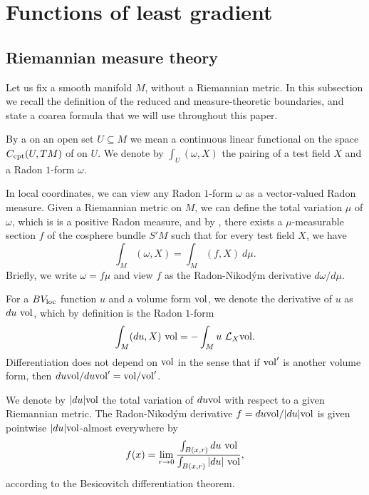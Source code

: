 \section{Functions of least gradient}\label{LeastGradientFunctions}
\subsection{Riemannian measure theory}
Let us fix a smooth manifold $M$, without a Riemannian metric.
In this subsection we recall the definition of the reduced and measure-theoretic boundaries, and state a coarea formula that we will use throughout this paper.

\begin{definition}
By a  on an open set $U \subseteq M$ we mean a continuous linear functional on the space $C_{\mathrm{cpt}}(U, TM)$ of  on $U$.
We denote by $\int_U (\omega, X)$ the pairing of a test field $X$ and a Radon $1$-form $\omega$.
\end{definition}

In local coordinates, we can view any Radon $1$-form $\omega$ as a vector-valued Radon measure.
Given a Riemannian metric on $M$, we can define the total variation $\mu$ of $\omega$, which is is a positive Radon measure, and by \cite[Theorem 4.14]{simon1983GMT}, there exists a $\mu$-measurable section $f$ of the cosphere bundle $S'M$ such that for every test field $X$, we have
\begin{equation}\label{RNy formula}
\int_M (\omega, X) = \int_M (f, X) ~d\mu.
\end{equation}
Briefly, we write $\omega = f\mu$ and view $f$ as the Radon-Nikod\'ym derivative $d\omega/d\mu$.

For a $BV_{\mathrm{loc}}$ function $u$ and a volume form $\mathrm{vol}$, we denote the derivative of $u$ as $du ~\mathrm{vol}$, which by definition is the Radon $1$-form
$$\int_M (du, X) ~\mathrm{vol} = -\int_M u ~\mathcal L_X\mathrm{vol}.$$
Differentiation does not depend on $\mathrm{vol}$ in the sense that if $\mathrm{vol}'$ is another volume form, then $du\mathrm{vol}/du\mathrm{vol}' = \mathrm{vol}/\mathrm{vol}'$.

We denote by $|du|\mathrm{vol}$ the total variation of $du\mathrm{vol}$ with respect to a given Riemannian metric.
The Radon-Nikod\'ym derivative $f = du\mathrm{vol}/|du|\mathrm{vol}$ is given pointwise $|du|\mathrm{vol}$-almost everywhere by 
\begin{equation}\label{Lebesgue point definition}
    f(x) = \lim_{r \to 0} \frac{\int_{B(x, r)} du ~\mathrm{vol}}{\int_{B(x, r)} |du| ~\mathrm{vol}},
\end{equation}
according to the Besicovitch differentiation theorem.

